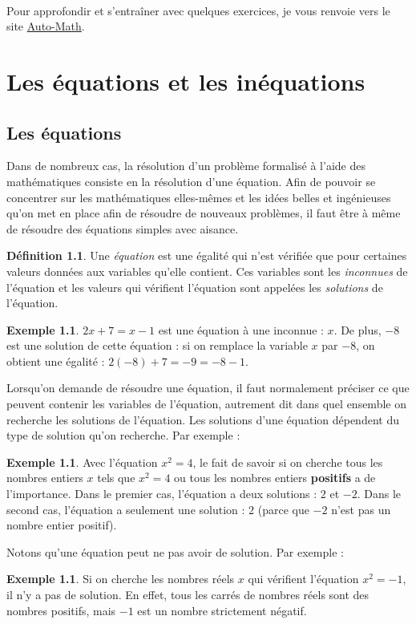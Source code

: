 \documentclass[a4paper,13pt]{scrreprt}
\theoremstyle{plain}
\theoremstyle{definition}
\newtheorem{déf}[subsection]{Définition}
\newtheorem{exe}[subsection]{Exemple}
\begin{document}
~\\
Pour approfondir et s'entraîner avec quelques exercices, je vous renvoie vers le site \href{https://www.auto-math.be/public/0/module/2}{Auto-Math}.
\chapter{Les équations et les inéquations}

\section{Les équations} \label{sectionequation}

Dans de nombreux cas, la résolution d'un problème formalisé à l'aide des mathématiques consiste en la résolution d'une équation. Afin de pouvoir se concentrer sur les mathématiques elles-mêmes et les idées belles et ingénieuses qu'on met en place afin de résoudre de nouveaux problèmes, il faut être à même de résoudre des équations simples avec aisance.

\begin{déf}
	Une \emph{équation} est une égalité qui n'est vérifiée que pour certaines valeurs données aux variables qu'elle contient. Ces variables sont les \emph{inconnues} de l'équation et les valeurs qui vérifient l'équation sont appelées les \emph{solutions} de l'équation.
\end{déf}

\begin{exe}
	$2x+7=x-1$ est une équation à une inconnue : $x$. De plus, $-8$ est une solution de cette équation : si on remplace la variable $x$ par $-8$, on obtient une égalité : $2(-8)+7=-9=-8-1$.
\end{exe}


Lorsqu'on demande de résoudre une équation, il faut normalement préciser ce que peuvent contenir les variables de l'équation, autrement dit dans quel ensemble on recherche les solutions de l'équation. Les solutions d'une équation dépendent du type de solution qu'on recherche. Par exemple :
\begin{exe}
	Avec l'équation $x^2=4$, le fait de savoir si on cherche tous les nombres entiers $x$ tels que $x^2=4$ ou tous les nombres entiers \textbf{positifs} a de l'importance. Dans le premier cas, l'équation a deux solutions : $2$ et $-2$. Dans le second cas, l'équation a seulement une solution : $2$ (parce que $-2$ n'est pas un nombre entier positif).
\end{exe}
Notons qu'une équation peut ne pas avoir de solution. Par exemple :
\begin{exe}
	Si on cherche les nombres réels $x$ qui vérifient l'équation $x^2=-1$, il n'y a pas de solution. En effet, tous les carrés de nombres réels sont des nombres positifs, mais $-1$ est un nombre strictement négatif.
\end{exe}
\end{document}
